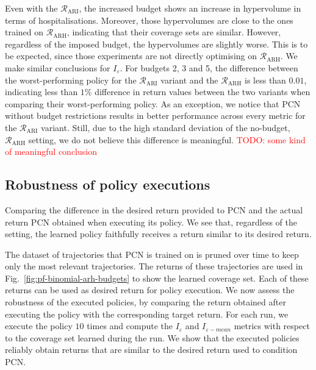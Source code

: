 \documentclass{article}
\newcommand\todo[1]{\textcolor{red}{TODO: #1}}
\newcommand{\mdprewardfn}{\mathcal{R}}
\begin{document}
Even with the $\mdprewardfn_\text{ARI}$, the increased budget shows an increase in hypervolume in terms of hospitalisations. Moreover, those hypervolumes are close to the ones trained on $\mdprewardfn_\text{ARH}$, indicating that their coverage sets are similar. However, regardless of the imposed budget, the hypervolumes are slightly worse. This is to be expected, since those experiments are not directly optimising on $\mdprewardfn_\text{ARH}$. We make similar conclusions for $I_\varepsilon$. For budgets 2, 3 and 5, the difference between the worst-performing policy for the $\mdprewardfn_\text{ARI}$ variant and the $\mdprewardfn_\text{ARH}$ is less than $0.01$, indicating less than $1\%$ difference in return values between the two variants when comparing their worst-performing policy. As an exception, we notice that PCN without budget restrictions results in better performance across every metric for the $\mdprewardfn_\text{ARI}$ variant. Still, due to the high standard deviation of the no-budget, $\mdprewardfn_\text{ARH}$ setting, we do not believe this difference is meaningful. \todo{some kind of meaningful conclusion}

\subsection{Robustness of policy executions}
\label{sec:pcn-robustness}

\begin{table}
    \centering
    \setlength{\tabcolsep}{0.5em} %
    {\renewcommand{\arraystretch}{1.2}%
    
    }
    \caption{Comparing the difference in the desired return provided to PCN and the actual return PCN obtained when executing its policy. We see that, regardless of the setting, the learned policy faithfully receives a return similar to its desired return.}
    \label{tab:pcn-robustness}
\end{table}

The dataset of trajectories that PCN is trained on is pruned over time to keep only the most relevant trajectories. The returns of these trajectories are used in Fig.~\ref{fig:pf-binomial-arh-budgets} to show the learned coverage set. Each of these returns can be used as desired return for policy execution. We now assess the robustness of the executed policies, by comparing the return obtained after executing the policy with the corresponding target return. For each run, we execute the policy $10$ times and compute the $I_\varepsilon$ and $I_{\varepsilon-mean}$ metrics with respect to the coverage set learned during the run. We show that the executed policies reliably obtain returns that are similar to the desired return used to condition PCN.
\end{document}
